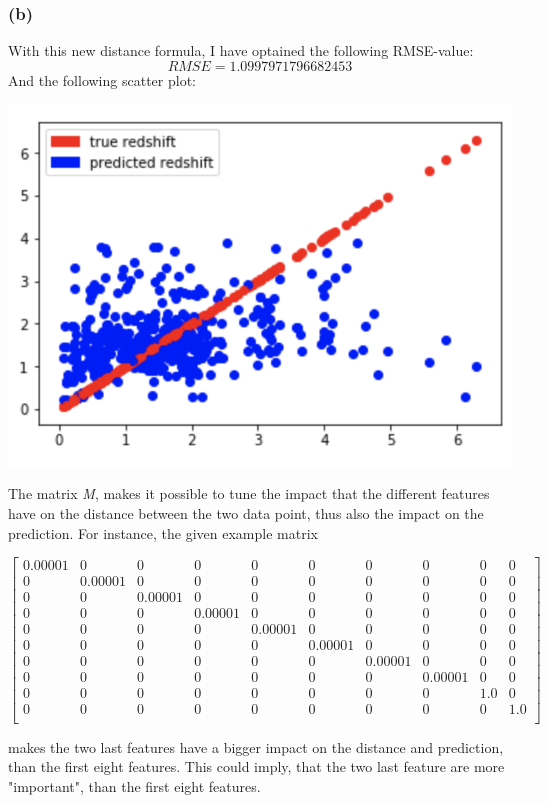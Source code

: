 \documentclass{report}
\begin{document}
\subsubsection*{(b)}
With this new distance formula, I have optained the following RMSE-value:
$$RMSE = 1.0997971796682453$$
And the following scatter plot:
\begin{center}
    \includegraphics[height = 7 cm]{kNN_Scatter_b}
\end{center}
The matrix \textit{M}, makes it possible to tune the impact that the different features have on the distance between the two data point, thus also the impact on the prediction. For instance, the given example matrix
\begin{center}
    \begin{math}
        \left[
        \begin{array}{cccccccccc}
            0.00001 & 0 & 0 & 0 & 0 & 0 & 0 & 0 & 0 & 0 \\
            0 & 0.00001 & 0 & 0 & 0 & 0 & 0 & 0 & 0 & 0 \\
            0 & 0 & 0.00001 & 0 & 0 & 0 & 0 & 0 & 0 & 0 \\
            0 & 0 & 0 & 0.00001 & 0 & 0 & 0 & 0 & 0 & 0 \\
            0 & 0 & 0 & 0 & 0.00001 & 0 & 0 & 0 & 0 & 0 \\
            0 & 0 & 0 & 0 & 0 & 0.00001 & 0 & 0 & 0 & 0 \\
            0 & 0 & 0 & 0 & 0 & 0 & 0.00001 & 0 & 0 & 0 \\
            0 & 0 & 0 & 0 & 0 & 0 & 0 & 0.00001 & 0 & 0 \\
            0 & 0 & 0 & 0 & 0 & 0 & 0 & 0 & 1.0 & 0 \\
            0 & 0 & 0 & 0 & 0 & 0 & 0 & 0 & 0 & 1.0 \\
        \end{array}
        \right]
    \end{math}
\end{center}
makes the two last features have a bigger impact on the distance and prediction, than the first eight features. This could imply, that the two last feature are more "important", than the first eight features.
\end{document}
